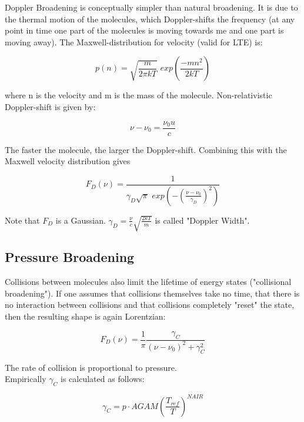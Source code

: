 Doppler Broadening is conceptually simpler than natural broadening. It is due to the thermal motion of the molecules, which Doppler-shifts the frequency (at any point in time one part of the molecules is moving towards me and one part is moving away). The Maxwell-distribution for velocity (valid for LTE) is:

\begin{equation}
p(n) = \sqrt{\frac{m}{2\pi kT}} \,\, exp(\frac{-mn^{2}}{2kT})  
\end{equation}

where n is the velocity and m is the mass of the molecule. 
Non-relativistic Doppler-shift is given by:

\begin{equation}
\nu - \nu_{0} = \frac{\nu_{0}u}{c}
\end{equation}

The faster the molecule, the larger the Doppler-shift. Combining this with the Maxwell velocity distribution gives

\begin{equation}
F_{D}(\nu) = \frac{1}{\gamma_{D}\sqrt{\pi} \,\, exp(-(\frac{\nu - \nu_{0}}{\gamma_{D}})^{2})}
\end{equation}

Note that $F_{D}$ is a Gaussian. $\gamma_{D} = \frac{\nu}{c} \sqrt{\frac{2kT}{m}}$ is called "Doppler Width". 

\subsection{Pressure Broadening}

Collisions between molecules also limit the lifetime of energy states ("collisional broadening"). If one assumes that collisions themselves take no time, that there is no interaction between collisions and that collisions completely "reset" the state, then the resulting shape is again Lorentzian:

\begin{equation}
F_{D}(\nu) = \frac{1}{\pi} \frac{\gamma_{C}}{(\nu - \nu_{0})^{2} + \gamma_{C}^{2}} 
\end{equation}

The rate of collision is proportional to pressure. \\

Empirically $\gamma_{C}$ is calculated as follows:

\begin{equation}
\gamma_{C} = p \cdot AGAM (\frac{T_{ref}}{T})^{NAIR}
\end{equation}

